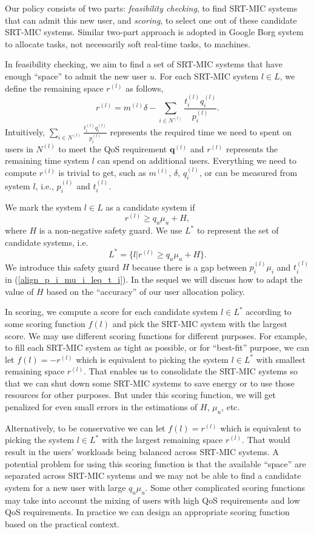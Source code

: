 \documentclass[prodmode,acmtompecs]{acmsmall}
\newcommand{\reqvec}{\mathbf{q}}
\newcommand{\reqscalar}{q}
\begin{document}
Our policy consists of two parts: {\em feasibility checking}, to find SRT-MIC systems that can admit this new user, and {\em scoring}, to select one out of these candidate SRT-MIC systems. Similar two-part approach is adopted in Google Borg system \cite{VPK15A} to allocate tasks, not necessarily soft real-time tasks, to machines. 

In feasibility checking, we aim to find a set of SRT-MIC systems that have enough ``space'' to admit the new user $u$. For each SRT-MIC system $l \in L$, we define the remaining space $r^{(l)}$ as follows, 
$$
r^{(l)} = m^{(l)} \delta - \sum\limits_{i\in N^{(l)}} \frac{t_i^{(l)} q_i^{(l)}}{p_i^{(l)}}. 
$$
Intuitively, $\sum\limits_{i\in N^{(l)}} \frac{t_i^{(l)} q_i^{(l)}}{p_i^{(l)}}$ represents the required time we need to spent on users in $N^{(l)}$ to meet the QoS requirement $\reqvec^{(l)}$ and $r^{(l)}$ represents the remaining time system $l$ can spend on additional users. Everything we need to compute $r^{(l)}$ is trivial to get, such as $m^{(l)}$, $\delta$, $q_i^{(l)}$, or can be measured from system $l$, i.e., $p_i^{(l)}$ and $t_i^{(l)}$. 

We mark the system $l\in L$ as a candidate system if 
$$
r^{(l)} \geq \reqscalar_u \mu_u + H, 
$$
where $H$ is a non-negative safety guard. We use $L^*$ to represent the set of candidate systems, i.e. 
$$
L^* = \{l | r^{(l)} \geq \reqscalar_u \mu_u + H \}. 
$$
We introduce this safety guard $H$ because there is a gap between $p_i^{(l)} \mu_i$ and $t_i^{(l)}$ in (\ref{align_p_i_mu_i_leq_t_i}). In the sequel we will discuss how to adapt the value of $H$ based on the ``accuracy'' of our user allocation policy. 

In scoring, we compute a score for each candidate system $l\in L^*$ according to some scoring function $f(l)$ and pick the SRT-MIC system with the largest score. We may use different scoring functions for different purposes. For example, to fill each SRT-MIC system as tight as possible, or for ``best-fit'' purpose, we can let $f(l) = -r^{(l)}$ which is equivalent to picking the system $l\in L^*$ with smallest remaining space $r^{(l)}$. That enables us to consolidate the SRT-MIC systems so that we can shut down some SRT-MIC systems to save energy or to use those resources for other purposes. But under this scoring function, we will get penalized for even small errors in the estimations of $H$, $\mu_u$, etc. 

Alternatively, to be conservative we can let $f(l) = r^{(l)}$ which is equivalent to picking the system $l \in L^*$ with the largest remaining space $r^{(l)}$. That would result in the users' workloads being balanced across SRT-MIC systems. A potential problem for using this scoring function is that the available ``space'' are separated across SRT-MIC systems and we may not be able to find a candidate system for a new user with large $\reqscalar_u \mu_u$. Some other complicated scoring functions may take into account the mixing of users with high QoS requirements and low QoS requirements. In practice we can design an appropriate scoring function based on the practical context. 
\end{document}
